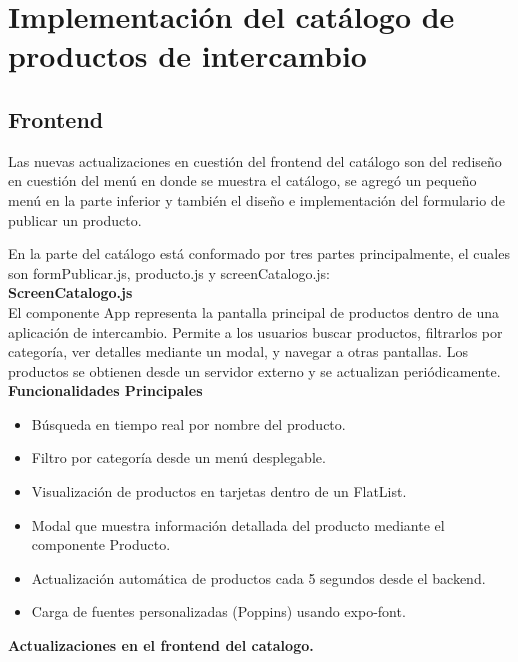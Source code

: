\documentclass[11pt, a4paper, oneside]{book}
\begin{document}

\chapter{Implementación del catálogo de productos de intercambio}
\noindent 
\section{Frontend}

Las nuevas actualizaciones en cuestión del frontend del catálogo son del rediseño en cuestión del menú en donde se muestra el catálogo, se agregó un pequeño menú en la parte inferior y también el diseño e implementación del formulario de publicar un producto.

En la parte del catálogo está conformado por tres partes principalmente, el cuales son formPublicar.js, producto.js y screenCatalogo.js:\\

\textbf {ScreenCatalogo.js} \\
El componente App representa la pantalla principal de productos dentro de una aplicación de intercambio. Permite a los usuarios buscar productos, filtrarlos por categoría, ver detalles mediante un modal, y navegar a otras pantallas. Los productos se obtienen desde un servidor externo y se actualizan periódicamente.\\


\textbf {Funcionalidades Principales}
\begin{itemize}
\item Búsqueda en tiempo real por nombre del producto.
\item Filtro por categoría desde un menú desplegable.
\item Visualización de productos en tarjetas dentro de un FlatList.
\item Modal que muestra información detallada del producto mediante el componente Producto.
\item Actualización automática de productos cada 5 segundos desde el backend.
\item Carga de fuentes personalizadas (Poppins) usando expo-font.
\end{itemize}

\begin{center}
\textbf {Actualizaciones en el frontend del catalogo.}    
\end{center}
\end{document}
